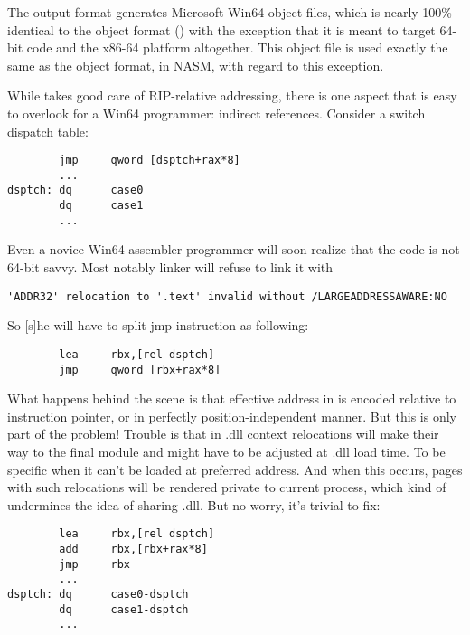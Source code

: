 
The  output format generates Microsoft Win64 object files,
which is nearly 100\% identical to the  object format
() with the exception that it is meant to target
64-bit code and the x86-64 platform altogether. This object file is used
exactly the same as the  object format, in NASM, with regard to this exception.


While  takes good care of RIP-relative addressing, there is one
aspect that is easy to overlook for a Win64 programmer: indirect
references. Consider a switch dispatch table:

\begin{lstlisting}
        jmp     qword [dsptch+rax*8]
        ...
dsptch: dq      case0
        dq      case1
        ...
\end{lstlisting}

Even a novice Win64 assembler programmer will soon realize that the code
is not 64-bit savvy. Most notably linker will refuse to link it with

\begin{lstlisting}
'ADDR32' relocation to '.text' invalid without /LARGEADDRESSAWARE:NO
\end{lstlisting}

So [s]he will have to split jmp instruction as following:

\begin{lstlisting}
        lea     rbx,[rel dsptch]
        jmp     qword [rbx+rax*8]
\end{lstlisting}

What happens behind the scene is that effective address in  is
encoded relative to instruction pointer, or in perfectly position-independent
manner. But this is only part of the problem! Trouble is that in .dll context
 relocations will make their way to the final module and might
have to be adjusted at .dll load time. To be specific when it can't be loaded
at preferred address. And when this occurs, pages with such relocations will
be rendered private to current process, which kind of undermines the idea
of sharing .dll. But no worry, it's trivial to fix:

\begin{lstlisting}
        lea     rbx,[rel dsptch]
        add     rbx,[rbx+rax*8]
        jmp     rbx
        ...
dsptch: dq      case0-dsptch
        dq      case1-dsptch
        ...
\end{lstlisting}

